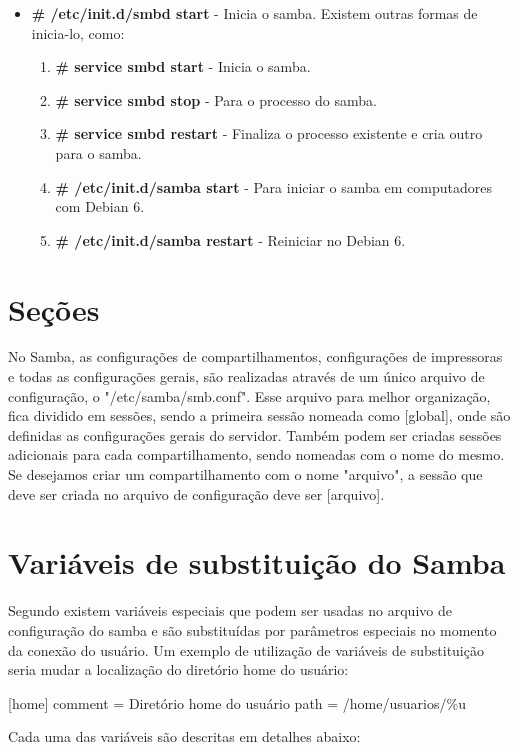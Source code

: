 \begin{itemize}
	\item \textbf{\# /etc/init.d/smbd start} - Inicia o samba. Existem outras formas de inicia-lo, como:
		\begin{enumerate}
			\item \textbf{\# service smbd start} - Inicia o samba.
			\item \textbf{\# service smbd stop} - Para o processo do samba.
			\item \textbf{\# service smbd restart} - Finaliza o processo existente e cria outro para o samba.
			\item \textbf{\# /etc/init.d/samba start} - Para iniciar o samba em computadores com Debian 6.
			\item \textbf{\# /etc/init.d/samba restart} - Reiniciar no Debian 6.
		\end{enumerate}
\end{itemize}

\section{Seções}

No Samba, as configurações de compartilhamentos, configurações de impressoras e todas as configurações gerais, são realizadas através de um único arquivo de configuração, o "/etc/samba/smb.conf". Esse arquivo para melhor organização, fica dividido em sessões, sendo a primeira sessão nomeada como [global], onde são definidas as configurações gerais do servidor. Também podem ser criadas sessões adicionais para cada compartilhamento, sendo nomeadas com o nome do mesmo. Se desejamos criar um compartilhamento com o nome "arquivo", a sessão que deve ser criada no arquivo de configuração deve ser [arquivo].

\section{Variáveis de substituição do Samba}

Segundo \cite{FOCA}  existem variáveis especiais que podem ser usadas no arquivo de configuração do samba e são substituídas por parâmetros especiais no momento da conexão do usuário. Um exemplo de utilização de variáveis de substituição seria mudar a localização do diretório home do usuário:

     [home]
      comment = Diretório home do usuário
      path = /home/usuarios/\%u

Cada uma das variáveis são descritas em detalhes abaixo:

